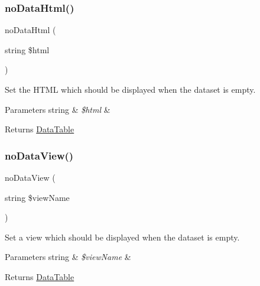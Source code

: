 \subsubsection{\texorpdfstring{no\+Data\+Html()}{noDataHtml()}}
{\footnotesize\ttfamily no\+Data\+Html (\begin{DoxyParamCaption}\item[{string}]{\$html }\end{DoxyParamCaption})}

Set the H\+T\+ML which should be displayed when the dataset is empty.


\begin{DoxyParams}[1]{Parameters}
string & {\em \$html} & \\
\hline
\end{DoxyParams}
\begin{DoxyReturn}{Returns}
\hyperlink{classhamburgscleanest_1_1_data_tables_1_1_models_1_1_data_table}{Data\+Table} 
\end{DoxyReturn}
\mbox{\label{classhamburgscleanest_1_1_data_tables_1_1_models_1_1_data_table_a3983a155c93b691cd1e069a3e46baaf6}} 
\subsubsection{\texorpdfstring{no\+Data\+View()}{noDataView()}}
{\footnotesize\ttfamily no\+Data\+View (\begin{DoxyParamCaption}\item[{string}]{\$view\+Name }\end{DoxyParamCaption})}

Set a view which should be displayed when the dataset is empty.


\begin{DoxyParams}[1]{Parameters}
string & {\em \$view\+Name} & \\
\hline
\end{DoxyParams}
\begin{DoxyReturn}{Returns}
\hyperlink{classhamburgscleanest_1_1_data_tables_1_1_models_1_1_data_table}{Data\+Table} 
\end{DoxyReturn}

